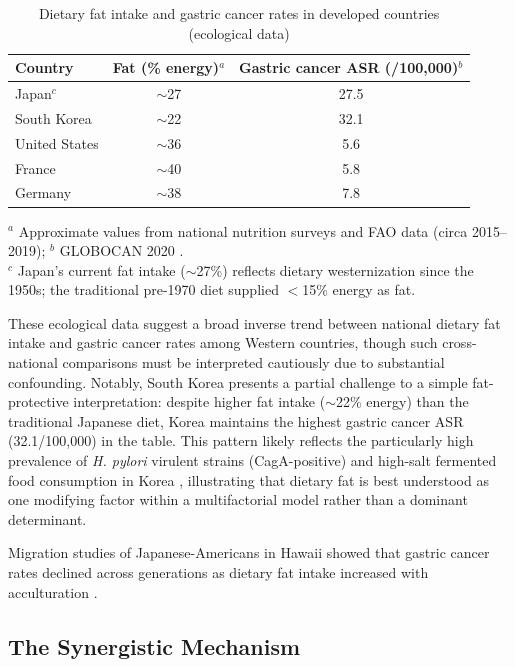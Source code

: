 \documentclass[review]{elsarticle}
\begin{document}
\begin{table}[htbp]
\centering
\caption{Dietary fat intake and gastric cancer rates in developed countries (ecological data)}
\label{tab:crossnational}
\begin{tabular}{lcc}
\toprule
Country & Fat (\% energy)$^a$ & Gastric cancer ASR (/100,000)$^b$ \\
\midrule
Japan$^c$ & $\sim$27 & 27.5 \\
South Korea & $\sim$22 & 32.1 \\
United States & $\sim$36 & 5.6 \\
France & $\sim$40 & 5.8 \\
Germany & $\sim$38 & 7.8 \\
\bottomrule
\end{tabular}
\begin{minipage}{\linewidth}
\footnotesize
\smallskip
$^a$ Approximate values from national nutrition surveys and FAO data (circa 2015--2019);
$^b$ GLOBOCAN 2020 \cite{sung2021}.\\
$^c$ Japan's current fat intake ($\sim$27\%) reflects dietary westernization since the 1950s;
the traditional pre-1970 diet supplied $<$15\% energy as fat.
\end{minipage}
\end{table}

These ecological data suggest a broad inverse trend between national dietary fat intake and gastric cancer rates among Western countries, though such cross-national comparisons must be interpreted cautiously due to substantial confounding. Notably, South Korea presents a partial challenge to a simple fat-protective interpretation: despite higher fat intake ($\sim$22\% energy) than the traditional Japanese diet, Korea maintains the highest gastric cancer ASR (32.1/100,000) in the table. This pattern likely reflects the particularly high prevalence of \textit{H. pylori} virulent strains (CagA-positive) and high-salt fermented food consumption in Korea \cite{delia2012,uemura2001}, illustrating that dietary fat is best understood as one modifying factor within a multifactorial model rather than a dominant determinant.

Migration studies of Japanese-Americans in Hawaii showed that gastric cancer rates declined across generations as dietary fat intake increased with acculturation \cite{kolonel1981}.

\subsection{The Synergistic Mechanism}
\end{document}
